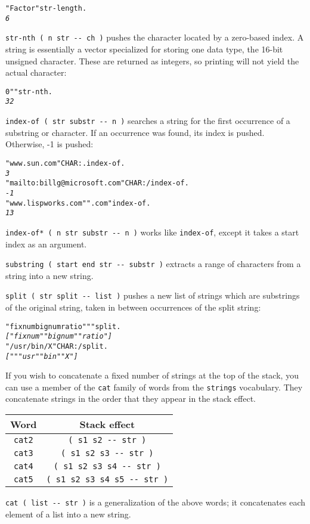 \documentclass[english]{article}
\providecommand{\tabularnewline}{\\}
\begin{document}
\begin{alltt}
"Factor" str-length .
\emph{6}
\end{alltt}
\texttt{str-nth ( n str -{}- ch )} pushes the character located by
a zero-based index. A string is essentially a vector specialized for
storing one data type, the 16-bit unsigned character. These are returned
as integers, so printing will not yield the actual character:
\begin{alltt}
0 " " str-nth .
\emph{32}
\end{alltt}
\texttt{index-of ( str substr -{}- n )} searches a string for the
first occurrence of a substring or character. If an occurrence was
found, its index is pushed. Otherwise, -1 is pushed:

\begin{alltt}
"www.sun.com" CHAR: . index-of .
\emph{3}
"mailto:billg@microsoft.com" CHAR: / index-of .
\emph{-1}
"www.lispworks.com" ".com" index-of .
\emph{13}
\end{alltt}
\texttt{index-of{*} ( n str substr -{}- n )} works like \texttt{index-of},
except it takes a start index as an argument.

\texttt{substring ( start end str -{}- substr )} extracts a range
of characters from a string into a new string.

\texttt{split ( str split -{}- list )} pushes a new list of strings
which are substrings of the original string, taken in between occurrences
of the split string:

\begin{alltt}
"fixnum bignum ratio" " " split .
\emph{{[} "fixnum" "bignum" "ratio" {]}}
"/usr/bin/X" CHAR: / split .
\emph{{[} "" "usr" "bin" "X" {]}}
\end{alltt}
If you wish to concatenate a fixed number of strings at the top of
the stack, you can use a member of the \texttt{cat} family of words
from the \texttt{strings} vocabulary. They concatenate strings in
the order that they appear in the stack effect.

\begin{tabular}{|c|c|}
\hline 
Word&
Stack effect\tabularnewline
\hline
\hline 
\texttt{cat2}&
\texttt{( s1 s2 -{}- str )}\tabularnewline
\hline 
\texttt{cat3}&
\texttt{( s1 s2 s3 -{}- str )}\tabularnewline
\hline 
\texttt{cat4}&
\texttt{( s1 s2 s3 s4 -{}- str )}\tabularnewline
\hline 
\texttt{cat5}&
\texttt{( s1 s2 s3 s4 s5 -{}- str )}\tabularnewline
\hline
\end{tabular}

\texttt{cat ( list -{}- str )} is a generalization of the above words;
it concatenates each element of a list into a new string.
\end{document}
